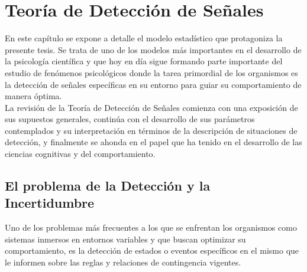 
\chapter{Teoría de Detección de Señales} %

\label{Cap_SDT} %


\newcommand{\keyword}[1]{\textbf{#1}}
\newcommand{\tabhead}[1]{\textbf{#1}}
\newcommand{\code}[1]{\texttt{#1}}
\newcommand{\file}[1]{\texttt{\bfseries#1}}
\newcommand{\option}[1]{\texttt{\itshape#1}}


En este capítulo se expone a detalle el modelo estadístico que protagoniza la presente tesis. Se trata de uno de los modelos más importantes en el desarrollo de la psicología científica y que hoy en día sigue formando parte importante del estudio de fenómenos psicológicos donde la tarea primordial de los organismos es la detección de señales específicas en su entorno para guiar su comportamiento de manera óptima.\\

La revisión de la Teoría de Detección de Señales comienza con una exposición de sus supuestos generales, continúa con el desarrollo de sus parámetros contemplados y su interpretación en términos de la descripción de situaciones de detección, y finalmente se ahonda en el papel que ha tenido en el desarrollo de las ciencias cognitivas y del comportamiento.\\

\section{El problema de la Detección y la Incertidumbre}

Uno de los problemas más frecuentes a los que se enfrentan los organismos como sistemas inmersos en entornos variables y que buscan optimizar su comportamiento, es la detección de estados o eventos específicos en el mismo que le informen sobre las reglas y relaciones de contingencia vigentes.\\

